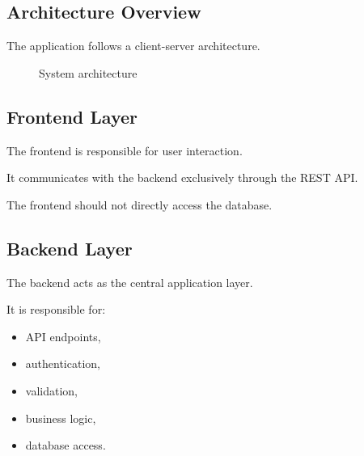 \documentclass[12pt,a4paper]{article}
\begin{document}
\subsection{Architecture Overview}

The application follows a client-server architecture.

\begin{figure}[H]
\centering


\caption{System architecture}
\label{fig:architecture}

\end{figure}

\subsection{Frontend Layer}

The frontend is responsible for user interaction.

It communicates with the backend exclusively through the REST API.

The frontend should not directly access the database.

\subsection{Backend Layer}

The backend acts as the central application layer.

It is responsible for:

\begin{itemize}
    \item API endpoints,
    \item authentication,
    \item validation,
    \item business logic,
    \item database access.
\end{itemize}
\end{document}
